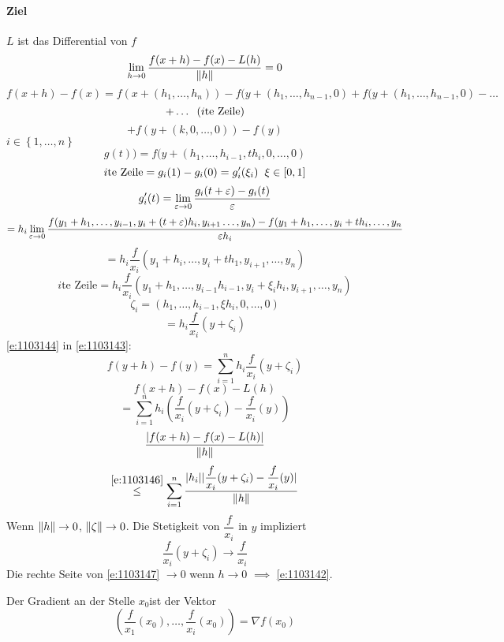 \begin{Bew}
  \paragraph{Ziel} $L$ ist das Differential von $f$
  \[\displaystyle\lim_{h\rightarrow0}\frac{f(x+h)-f(x)-L(h)}{\left\| h \right\|}=0\]
  \[f(x+h)-f(x)=f(x+(h_1,\dots,h_n))-f(y+(h_1,\dots,h_{n-1},0)+f(y+(h_1,\dots,h_{n-1}, 0)-\dots\]
  \[+\dots\hspace{2mm}(\text{$i$te Zeile})\]
  \begin{equation}
    \label{e:1103143}
    +f(y+(k,0,\dots,0))-f(y)
  \end{equation}
  $i\in\left\{ 1,\dots,n \right\}$
  \[g(t))=f(y+(h_1,\dots,h_{i-1},th_i,0,\dots,0)\]
  \[\text{$i$te Zeile}=g_i(1)-g_i(0)=g_i'(\xi_i)\hspace{2mm}\xi\in \left[ 0,1 \right]\]
  \[g_i'(t)=\displaystyle\lim_{\varepsilon\rightarrow0}\frac{g_i(t+\varepsilon)-g_i(t)}{\varepsilon}\]
  \[=h_i\displaystyle\lim_{\varepsilon\rightarrow0}\frac{f(y_1+h_1,\dots,y_{i-1},y_i+(t+\varepsilon)h_i,y_{i+1}\dots,y_n)-f(y_1+h_1,\dots,y_i+th_i,\dots,y_n}{\varepsilon h_i}\]
  \[=h_i\dfrac{f}{x_i}\left( y_1+h_i,\dots,y_i+th_1,y_{i+1},\dots,y_n \right)\]
  \[\text{$i$te Zeile}=h_i\dfrac{f}{x_i}(y_1+h_1,\dots,y_{i-1}h_{i-1},y_i+\xi_ih_i,y_{i+1},\dots,y_n)\]
  \[\zeta_i=\left( h_1,\dots,h_{i-1},\xi h_i,0,\dots,0 \right)\]
  \begin{equation}
    \label{e:1103144}
    =h_i\dfrac{f}{x_i}(y+\zeta_i)
  \end{equation}
  \ref{e:1103144} in \ref{e:1103143}:
  \begin{equation}
    \label{e:1103145}
    f(y+h)-f(y)=\sum_{i=1}^nh_i\dfrac{f}{x_i}(y+\zeta_i)
  \end{equation}
  \[f(x+h)-f(x)-L(h)\]
  \begin{equation}
    \label{e:1103146}
    =\sum_{i=1}^nh_i\left( \dfrac{f}{x_i}(y+\zeta_i)-\dfrac{f}{x_i}(y) \right)
  \end{equation}
  \[\frac{\mathopen| f(x+h)-f(x)-L(h) \mathclose|}{\left\| h \right\|}\]
  \begin{equation}
    \label{e:1103147}
    \stackrel{\ref{e:1103146}}{\leq}\sum_{i=1}^n\frac{\mathopen| h_i \mathclose|\mathopen| \dfrac{f}{x_i}(y+\zeta_i)-\dfrac{f}{x_i}(y) \mathclose|}{\left\| h \right\|}
  \end{equation}
  Wenn $\left\| h \right\|\rightarrow 0$, $\left\| \zeta \right\|\rightarrow 0$. Die Stetigkeit von $\dfrac{f}{x_i}$ in $y$ impliziert
  \[\dfrac{f}{x_i}(y+\zeta_i)\to\dfrac{f}{x_i}\]
  Die rechte Seite von \ref{e:1103147} $\to 0$ wenn $h\to 0$ $\implies$ \ref{e:1103142}.
\end{Bew}
\begin{Def}
  Der Gradient an der Stelle $x_0$ist der Vektor
  \[\left( \dfrac{f}{x_1}(x_0),\dots,\dfrac{f}{x_i}(x_0) \right)=\nabla f(x_0)\]
\end{Def}
